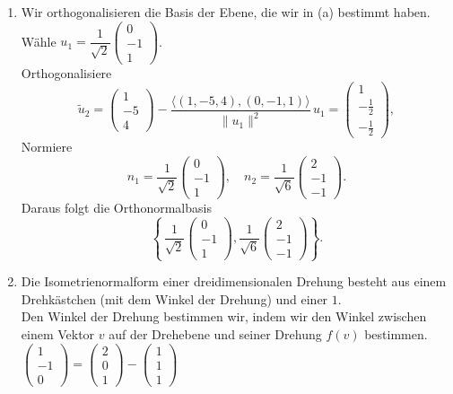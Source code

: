 \documentclass[11pt, a4paper]{article}
\begin{document}
\begin{enumerate}
  \item
  Wir orthogonalisieren die Basis der Ebene, die wir in (a) bestimmt haben.\\
  Wähle $u_1=\dfrac{1}{\sqrt2}\begin{pmatrix}0\\-1\\1\end{pmatrix}$.\\
  Orthogonalisiere \\
  \[
  \tilde u_2=\begin{pmatrix}1\\-5\\4\end{pmatrix}
  -\frac{\langle(1,-5,4),(0,-1,1)\rangle}{\|u_1\|^2}\,u_1
  =\begin{pmatrix}1\\-\tfrac12\\-\tfrac12\end{pmatrix},
  \]
  Normiere \\
  \[
  n_1=\frac{1}{\sqrt{2}}\begin{pmatrix}0\\-1\\1\end{pmatrix} ,\quad 
  n_2=\frac{1}{\sqrt{6}}\begin{pmatrix}2\\-1\\-1\end{pmatrix}.
  \]
  Daraus folgt die Orthonormalbasis
  \[
  \left\{\,
  \frac{1}{\sqrt{2}}\begin{pmatrix}0\\-1\\1\end{pmatrix},
  \frac{1}{\sqrt{6}}\begin{pmatrix}2\\-1\\-1\end{pmatrix}\right\}.
  \]
  \item
  Die Isometrienormalform einer dreidimensionalen Drehung besteht aus einem Drehkästchen (mit dem Winkel der Drehung) und einer $1$. \\
  Den Winkel der Drehung bestimmen wir, indem wir den Winkel zwischen einem Vektor $v$ auf der Drehebene und seiner Drehung $f(v)$ bestimmen.\\
  $\begin{pmatrix}1\\-1\\0\end{pmatrix} = \begin{pmatrix}2\\0\\1\end{pmatrix} - \begin{pmatrix}1\\1\\1\end{pmatrix}$ 

\end{enumerate}
\end{document}
